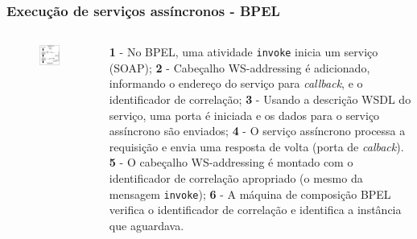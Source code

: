 \documentclass[red, cover=invisible, theme=Warsaw]{myslides}
\begin{document}
	\begin{frame}[plain]\frametitle{Execução de serviços assíncronos - BPEL}	
	    \begin{columns}
		\begin{column}{7cm}
		    \begin{figure}[!htb]
			\begin{center}
			    \includegraphics[scale=0.35]{imagens/bpelassinc.pdf}
			\end{center}
		    \end{figure}		    
		\end{column}
		\begin{column}{5cm}
		\begin{overprint}
			\textbf{1} - No BPEL, uma atividade \texttt{invoke} inicia um serviço (SOAP);
			\onslide<2>\textbf{2} - Cabeçalho WS-addressing é adicionado, informando o endereço do serviço para \textit{callback}, e o identificador de correlação;
			\onslide<3>\textbf{3} - Usando a descrição WSDL do serviço, uma porta é iniciada e os dados para o serviço assíncrono são enviados;
			\onslide<4>\textbf{4} - O serviço assíncrono processa a requisição e envia uma resposta de volta (porta de \textit{calback}).
			\onslide<5>\textbf{5} - O cabeçalho WS-addressing é montado com o identificador de correlação apropriado (o mesmo da mensagem \texttt{invoke});
			\onslide<6>\textbf{6} - A máquina de composição BPEL verifica o identificador de correlação e identifica a instância que aguardava.
		\end{overprint}
		\end{column}
	    \end{columns}	    	    
	\end{frame}
	
\end{document}
